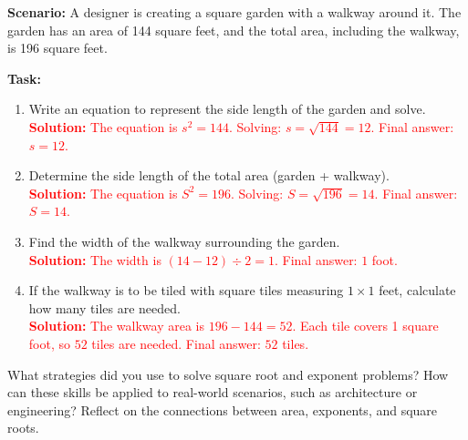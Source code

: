 \documentclass[10pt]{article}
\begin{document}
\vspace{1em}

\begin{tcolorbox}[colframe=black!60, colback=white, 
coltitle=black, colbacktitle=black!15, fonttitle=\bfseries\Large, 
title=Performance Task: Designing a Garden, halign title=center, left=10pt, right=10pt, top=10pt, bottom=100pt]
\textbf{Scenario:} A designer is creating a square garden with a walkway around it. The garden has an area of 144 square feet, and the total area, including the walkway, is 196 square feet.

\textbf{Task:}
\begin{enumerate}[itemsep=4.5em]
    \item Write an equation to represent the side length of the garden and solve.\\
    \textcolor{red}{\textbf{Solution:} The equation is \(s^2 = 144\). Solving: \(s = \sqrt{144} = 12\). Final answer: \(s = 12\).}

    \item Determine the side length of the total area (garden + walkway).\\
    \textcolor{red}{\textbf{Solution:} The equation is \(S^2 = 196\). Solving: \(S = \sqrt{196} = 14\). Final answer: \(S = 14\).}

    \item Find the width of the walkway surrounding the garden.\\
    \textcolor{red}{\textbf{Solution:} The width is \((14 - 12) \div 2 = 1\). Final answer: \(1\) foot.}

    \item If the walkway is to be tiled with square tiles measuring \(1 \times 1\) feet, calculate how many tiles are needed.\\
    \textcolor{red}{\textbf{Solution:} The walkway area is \(196 - 144 = 52\). Each tile covers 1 square foot, so \(52\) tiles are needed. Final answer: \(52\) tiles.}
\end{enumerate}
\end{tcolorbox}

\vspace{1em}

\begin{tcolorbox}[colframe=black!60, colback=white, 
coltitle=black, colbacktitle=black!15, fonttitle=\bfseries\Large, 
title=Reflection, halign title=center, left=10pt, right=10pt, top=10pt, bottom=100pt]
What strategies did you use to solve square root and exponent problems? How can these skills be applied to real-world scenarios, such as architecture or engineering? Reflect on the connections between area, exponents, and square roots.
\end{tcolorbox}
\end{document}
